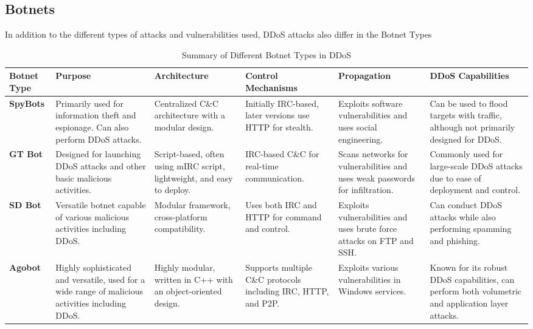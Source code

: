 \documentclass[a4paper, 12pt]{report} %
\begin{document}
            \subsection{Botnets}
            In addition to the different types of attacks and vulnerabilities used, DDoS attacks also differ in the Botnet Types
            \begin{spacing}{1}
                
                \begin{table}[h!]
                    \centering
                    \caption{Summary of Different Botnet Types in DDoS}
                    \label{tab:botnet_summary}
                    \begin{tabularx}{\textwidth}{|X|X|X|X|X|X|}
                        \hline
                        \textbf{Botnet Type} & \textbf{Purpose} & \textbf{Architecture} & \textbf{Control Mechanisms} & \textbf{Propagation} & \textbf{DDoS Capabilities} \\
                        \hline
                        \textbf{SpyBots} & Primarily used for information theft and espionage. Can also perform DDoS attacks. & Centralized C\&C architecture with a modular design. & Initially IRC-based, later versions use HTTP for stealth. & Exploits software vulnerabilities and uses social engineering. & Can be used to flood targets with traffic, although not primarily designed for DDoS. \\
                        \hline
                        \textbf{GT Bot} & Designed for launching DDoS attacks and other basic malicious activities. & Script-based, often using mIRC script, lightweight, and easy to deploy. & IRC-based C\&C for real-time communication. & Scans networks for vulnerabilities and uses weak passwords for infiltration. & Commonly used for large-scale DDoS attacks due to ease of deployment and control. \\
                        \hline
                        \textbf{SD Bot} & Versatile botnet capable of various malicious activities including DDoS. & Modular framework, cross-platform compatibility. & Uses both IRC and HTTP for command and control. & Exploits vulnerabilities and uses brute force attacks on FTP and SSH. & Can conduct DDoS attacks while also performing spamming and phishing. \\
                        \hline
                        \textbf{Agobot} & Highly sophisticated and versatile, used for a wide range of malicious activities including DDoS. & Highly modular, written in C++ with an object-oriented design. & Supports multiple C\&C protocols including IRC, HTTP, and P2P. & Exploits various vulnerabilities in Windows services. & Known for its robust DDoS capabilities, can perform both volumetric and application layer attacks. \\
                        \hline
                    \end{tabularx}
                    
                \end{table}
                
            \end{spacing}    
\end{document}
